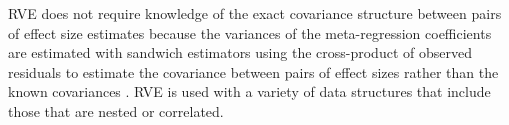 RVE does not require knowledge of the exact covariance structure between pairs of effect size estimates because the variances of the meta-regression coefficients are estimated with sandwich estimators using the cross-product of observed residuals to estimate the covariance between pairs of effect sizes rather than the known covariances \cite{hedges2010, tipton2015}. RVE is used with a variety of data structures that include those that are nested or correlated.









